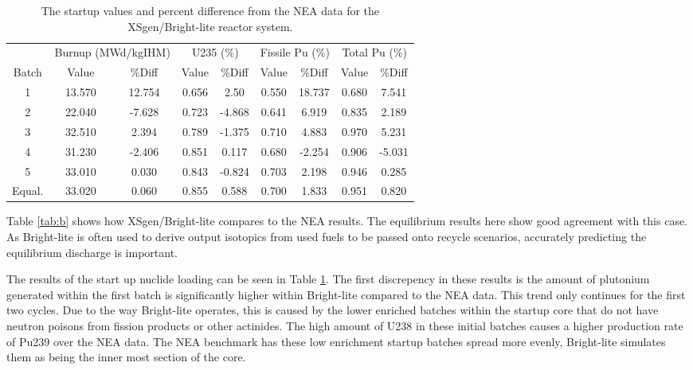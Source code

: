 \documentclass{article}
\begin{document}
\begin{table}[!htb]
\centering
\caption{The startup values and percent difference from the NEA data for the XSgen/Bright-lite reactor system.}
\label{tab:c}
\begin{tabular}{c cc | cc | cc | cc}
 & \multicolumn{2}{p{1cm}}{Burnup (MWd/kgIHM)} & \multicolumn{2}{c}{U235 (\%)} & \multicolumn{2}{c}{Fissile Pu (\%)} & \multicolumn{2}{c}{Total Pu (\%)} \\
Batch & Value & \%Diff & Value & \%Diff & Value & \%Diff & Value & \%Diff \\
1 & 13.570 & 12.754 & 0.656 & 2.50 & 0.550 & 18.737 & 0.680 & 7.541 \\
2 & 22.040 & -7.628 & 0.723 & -4.868 & 0.641 & 6.919 & 0.835 & 2.189 \\
3 & 32.510 & 2.394 & 0.789 & -1.375 & 0.710 & 4.883 & 0.970 & 5.231 \\
4 & 31.230 & -2.406 & 0.851 & 0.117 & 0.680 & -2.254 & 0.906 & -5.031 \\
5 & 33.010 & 0.030 & 0.843 & -0.824 & 0.703 & 2.198 & 0.946 & 0.285 \\
Equal. & 33.020 & 0.060 & 0.855 & 0.588 & 0.700 & 1.833 & 0.951 & 0.820
\end{tabular}
\end{table}

Table \ref{tab:b} shows how XSgen/Bright-lite compares to the NEA results. The equilibrium results here show good agreement with this case. As Bright-lite is often used to derive output isotopics from used fuels to be passed onto recycle scenarios, accurately predicting the equilibrium discharge is important.

The results of the start up nuclide loading can be seen in Table \ref{tab:c}. The first discrepency in these results is the amount of plutonium generated within the first batch is significantly higher within Bright-lite compared to the NEA data. This trend only continues for the first two cycles. Due to the way Bright-lite operates, this is caused by the lower enriched batches within the startup core that do not have neutron poisons from fission products or other actinides. The high amount of U238 in these initial batches causes a higher production rate of Pu239 over the NEA data. The NEA benchmark has these low enrichment startup batches spread more evenly, Bright-lite simulates them as being the inner most section of the core.
\end{document}
